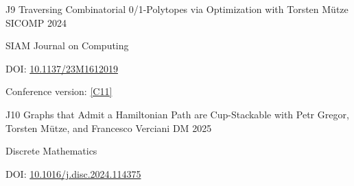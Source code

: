 \begin{cvpublication}
	{J9}
	{Traversing Combinatorial 0/1-Polytopes via Optimization}
	{with Torsten Mütze}
	{SICOMP}
	{2024}
    {
	\begin{cvitems}
	\item SIAM Journal on Computing
	\item[] DOI: \href{https://doi.org/10.1137/23M1612019}{10.1137/23M1612019}
	\item Conference version: \hyperlink{paperC11}{[C11]}
	\end{cvitems}
	}
\end{cvpublication}
\begin{cvpublication}
	{J10}
	{Graphs that Admit a Hamiltonian Path are Cup-Stackable}
	{with Petr Gregor, Torsten Mütze, and Francesco Verciani}
	{DM}
	{2025}
    {
	\begin{cvitems}
	\item Discrete Mathematics
	\item[] DOI: \href{https://doi.org/10.1016/j.disc.2024.114375}{10.1016/j.disc.2024.114375}
	\end{cvitems}
	}
\end{cvpublication}

\vspace{{1 mm}}

